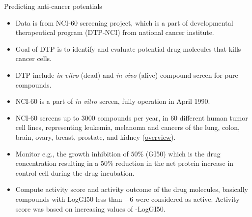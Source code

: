 \documentclass[first=dgreen,second=purple,logo=yellowexc]{aaltoslides}
\begin{document}
{\begin{frame}{Predicting anti-cancer potentials}
	\begin{itemize}
		\item Data is from NCI-60 screening project, which is a part of developmental therapeutical program (DTP-NCI) from national cancer institute.
		\item Goal of DTP is to identify and evaluate potential drug molecules that kills cancer cells.
		\item DTP include \textit{in vitro} (dead) and \textit{in vivo} (alive) compound screen for pure compounds.
		\item NCI-60 is a part of \textit{in vitro} screen, fully operation in April 1990.
		\item NCI-60 screens up to $3000$ compounds per year, in $60$ different human tumor cell lines, representing leukemia, melanoma and cancers of the lung, colon, brain, ovary, breast, prostate, and kidney (\href{http://discover.nci.nih.gov/cellminer/celllineMetadata.do}{overview}). 
		\item Monitor e.g., the growth inhibition of $50\%$ (GI50)  which is the drug concentration resulting in a $50\%$ reduction in the net protein increase in control cell during the drug incubation.
		\item Compute activity score and activity outcome of the drug molecules, basically compounds with LogGI50 less than $-6$ were considered as active. Activity score was based on increasing values of -LogGI50.
	\end{itemize}
\end{frame}

}
\end{document}

